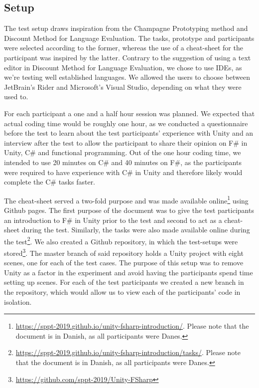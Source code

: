 \subsection{Setup}
The test setup draws inspiration from the Champagne Prototyping method and Discount Method for Language Evaluation. The tasks, prototype and participants were selected according to the former, whereas the use of a cheat-sheet for the participant was inspired by the latter. Contrary to the suggestion of using a text editor in Discount Method for Language Evaluation, we chose to use \glspl{IDE}, as we're testing well established languages. We allowed the users to choose between JetBrain's Rider and Microsoft's Visual Studio, depending on what they were used to.

For each participant a one and a half hour session was planned. We expected that actual coding time would be roughly one hour, as we conducted a questionnaire before the test to learn about the test participants' experience with Unity and an interview after the test to allow the participant to share their opinion on F\# in Unity, C\# and functional programming. Out of the one hour coding time, we intended to use 20 minutes on C\# and 40 minutes on F\#, as the participants were required to have experience with C\# in Unity and therefore likely would complete the C\# tasks faster.

The cheat-sheet served a two-fold purpose and was made available online\footnote{\url{https://sppt-2019.github.io/unity-fsharp-introduction/}. Please note that the document is in Danish, as all participants were Danes.} using Github pages. The first purpose of the document was to give the test participants an introduction to F\# in Unity prior to the test and second to act as a cheat-sheet during the test. Similarly, the tasks were also made available online during the test\footnote{\url{https://sppt-2019.github.io/unity-fsharp-introduction/tasks/}. Please note that the document is in Danish, as all participants were Danes.}. We also created a Github repository, in which the test-setups were stored\footnote{\url{https://github.com/sppt-2019/Unity-FSharp}}. The master branch of said repository holds a Unity project with eight scenes, one for each of the test cases. The purpose of this setup was to remove Unity as a factor in the experiment and avoid having the participants spend time setting up scenes. For each of the test participants we created a new branch in the repository, which would allow us to view each of the participants' code in isolation.

